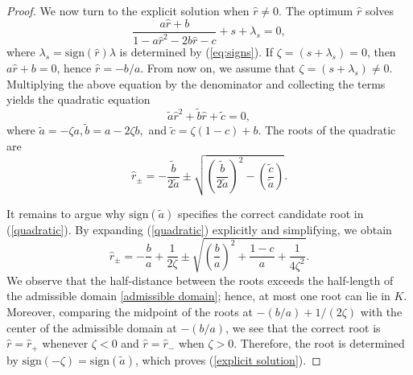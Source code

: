 \documentclass[10pt,a4paper]{amsart}
\newcommand{\sign}{\mathrm{sign}}
\begin{document}
\begin{proof}
We now turn to the explicit solution when $\hat{r}\neq 0$. The optimum $\hat{r}$ solves
\begin{equation*}
\frac{ a\hat{r} +b}{1-a \hat{r}^2 - 2b \hat{r} -c} + s + \lambda_s=0,
\end{equation*}
where $\lambda_s=  \sign(\hat{r}) \lambda$ is determined by (\ref{eq:signs}). If $\zeta=(s + \lambda_s)=0$, then $a\hat{r}+b=0$, hence $\hat{r}=-b/a$. From now on, we assume that $\zeta=(s + \lambda_s)\neq 0$. Multiplying the above equation by the denominator and collecting the terms yields the quadratic equation
$$
\tilde{a} \hat{r}^2 + \tilde{b} \hat{r} + \tilde{c} = 0,
$$
where $\tilde{a}  = -\zeta a, \tilde{b} = a -2\zeta b, $ and $\tilde{c} =\zeta(1-c)+b $. The roots of the quadratic are
\begin{equation}\label{quadratic}
\hat{r}_{\pm} = -\frac{\tilde{b}}{2\tilde{a}} \pm\sqrt{\left(\frac{\tilde{b}}{2\tilde{a}}\right)^2 - \left(\frac{\tilde{c}}{\tilde{a}}\right)}.
\end{equation}


It remains to argue why $\sign(\tilde{a})$ specifies the correct candidate root in (\ref{quadratic}). 
By expanding (\ref{quadratic}) explicitly and simplifying, we obtain
    \begin{equation*}
        \hat{r}_{\pm}=-\dfrac{b}{a}+\dfrac{1}{2\zeta}\pm\sqrt{\left(\dfrac{b}{a}\right)^2+\dfrac{1-c}{a}+\dfrac{1}{4\zeta^2}}.
    \end{equation*}
We observe that the half-distance between the roots exceeds the half-length of the admissible domain
\eqref{admissible domain}; hence, at most one root can lie in $K$. Moreover, comparing the midpoint of the roots at $-(b/a)+1/(2\zeta)$ with the center of the admissible domain at $-(b/a)$, we see that the correct root is $\hat{r}=\hat{r}_+$ whenever $\zeta<0$ and $\hat{r}=\hat{r}_-$ when $\zeta>0$. Therefore, the root is determined by $\sign(-\zeta)=\sign(\tilde{a})$, which proves (\ref{explicit solution}). 
\end{proof}
\end{document}
